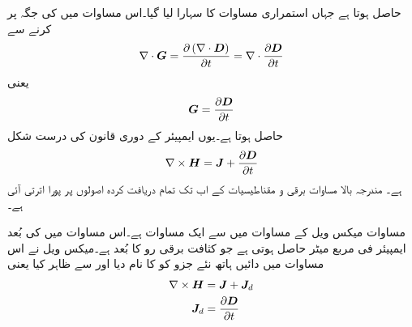 حاصل ہوتا ہے جہاں استمراری مساوات کا سہارا لیا گیا۔اس مساوات میں  کی جگہ  پر کرنے سے
\begin{align*}
\nabla \cdot {\ensuremath{{\boldsymbol{G}}}}=\frac{\partial \left(\nabla \cdot {\ensuremath{{\boldsymbol{D}}}} \right)}{\partial t}=\nabla \cdot \frac{\partial {\ensuremath{{\boldsymbol{D}}}}}{\partial t}
\end{align*}
یعنی
 \begin{align*}
{\ensuremath{{\boldsymbol{G}}}}=\frac{\partial {\ensuremath{{\boldsymbol{D}}}}}{\partial t}
\end{align*}
حاصل ہوتا ہے۔یوں ایمپیئر کے دوری قانون کی درست شکل
\begin{align}\label{مساوات-میکس_ویل_دوسری_مساوات_نقطہ_شکل}
\nabla \times {\ensuremath{{\boldsymbol{H}}}}={{\boldsymbol{J}}}+\frac{\partial {\ensuremath{{\boldsymbol{D}}}}}{\partial t}
\end{align}
ہے۔ مندرجہ بالا مساوات برقی و مقناطیسیات کے اب تک تمام دریافت کردہ اصولوں پر پورا اترتی آئی ہے۔

مساوات  میکس ویل کے مساوات میں سے ایک مساوات ہے۔اس مساوات میں  کی بُعد ایمپیئر فی مربع میٹر حاصل ہوتی ہے جو کثافت برقی رو کا بُعد ہے۔میکس ویل نے اس مساوات میں دائیں ہاتھ نئے جزو  کو  کا نام دیا اور  سے ظاہر کیا یعنی
\begin{align*}
\nabla \times {\ensuremath{{\boldsymbol{H}}}}&={{\boldsymbol{J}}}+{{\boldsymbol{J}}}_d\\
{{\boldsymbol{J}}}_d&=\frac{\partial {\ensuremath{{\boldsymbol{D}}}}}{\partial t}
\end{align*}
